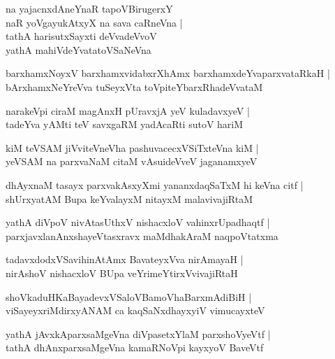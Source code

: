 \documentclass[twoside,12pt,openright]{book}
\newcounter{shloka}[chapter]
\begin{document}
\begin{shloka}%
na yajacnxdAneYnaR tapoVBirugerxY \\
naR yoVgayukAtxyX na sava caRneVna |\\
tathA harisutxSayxti deVvadeVvoV \\
yathA mahiVdeYvatatoVSaNeVna 
\end{shloka}

\begin{shloka}%
barxhamxNoyxV barxhamxvidabxrXhAmx barxhamxdeYvaparxvataRkaH |\\
bArxhamxNeYreVva tuSeyxVta toVpiteYbarxRhadeVvataM 
\end{shloka}

\begin{shloka}%
narakeVpi ciraM magAnxH pUravxjA yeV kuladavxyeV |\\
tadeYva yAMti teV savxgaRM yadAcaRti sutoV hariM 
\end{shloka}

\begin{shloka}%
kiM teVSAM jiVviteVneVha pashuvacecxVSiTxteVna kiM |\\
yeVSAM na parxvaNaM citaM vAsuideVveV jaganamxyeV
\end{shloka}

\begin{shloka}%
dhAyxnaM tasayx parxvakAsxyXmi yananxdaqSaTxM hi keVna citf |\\
shUrxyatAM Bupa keYvalayxM nitayxM malavivajiRtaM
\end{shloka}

\begin{shloka}%
yathA diVpoV nivAtasUthxV nishacxloV vahinxrUpadhaqtf |\\
parxjavxlanAnxshayeVtasxravx maMdhakAraM naqpoVtatxma
\end{shloka}

\begin{shloka}%
tadavxdodxVSavihinAtAmx BavateyxVva nirAmayaH |\\
nirAshoV nishacxloV BUpa veYrimeYtirxVvivajiRtaH 
\end{shloka}

\begin{shloka}%
shoVkaduHKaBayadevxVSaloVBamoVhaBarxmAdiBiH |\\
viSayeyxriMdirxyANAM ca kaqSaNxdhayxyiV vimucayxteV 
\end{shloka}

\begin{shloka}%
yathA jAvxkAparxsaMgeVna diVpasetxYlaM parxshoVyeVtf |\\
tathA dhAnxparxsaMgeVna kamaRNoVpi kayxyoV BaveVtf
\end{shloka}
\end{document}
